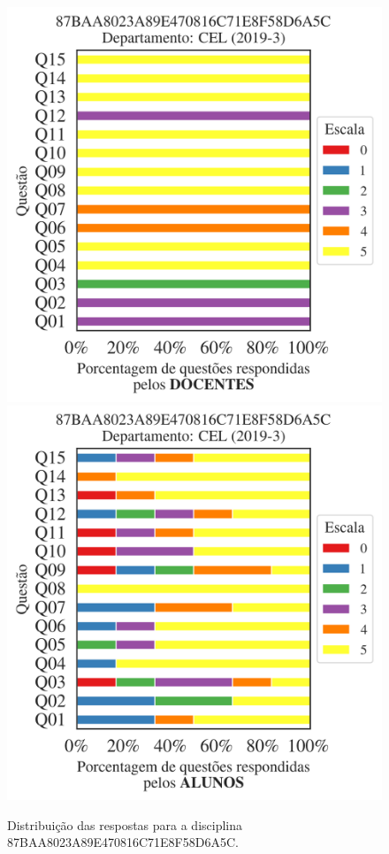 \documentclass[a4paper,10pt]{article}
\begin{document}
\begin{figure}[h]
\centering
\includegraphics[width=0.485\linewidth]{analise_disciplina_departamento_CEL_87BAA8023A89E470816C71E8F58D6A5C_docentes.png}
\includegraphics[width=0.485\linewidth]{analise_disciplina_departamento_CEL_87BAA8023A89E470816C71E8F58D6A5C_alunos.png}
\caption{\label{fig:analise_geral_departamento}                Distribuição das respostas para a disciplina 87BAA8023A89E470816C71E8F58D6A5C. }
\end{figure}
\end{document}
